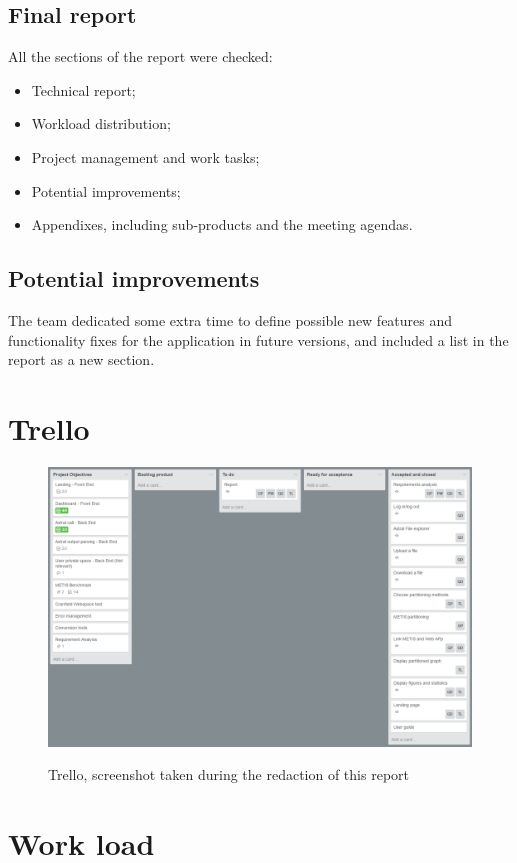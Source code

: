 \documentclass{cranfieldChart}
\begin{document}
\subsection*{Final report}
All the sections of the report were checked:
\begin{itemize}
	\item Technical report;
	\item Workload distribution;
	\item Project management and work tasks;
	\item Potential improvements;
	\item Appendixes, including sub-products and the meeting agendas.
\end{itemize} 
\subsection*{Potential improvements}
The team dedicated some extra time to define possible new features and functionality fixes for the application in future versions, and included a list in the report as a new section.
\newpage
\section{Trello}

\begin{figure}[h!]
\centering
\includegraphics[width=1\textwidth]{ressources/trello}
\label{trello}
\caption{Trello, screenshot taken during the redaction of this report}
\end{figure}

\newpage

\section{Work load}
\end{document}
